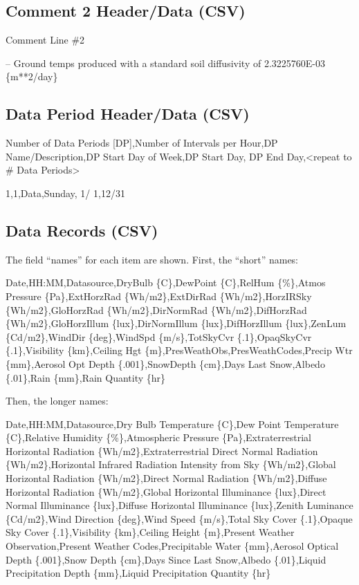 \subsection{Comment 2 Header/Data (CSV)}\label{comment-2-headerdata-csv}

Comment Line \#2

-- Ground temps produced with a standard soil diffusivity of 2.3225760E-03 \{m**2/day\}

\subsection{Data Period Header/Data (CSV)}\label{data-period-headerdata-csv}

Number of Data Periods {[}DP{]},Number of Intervals per Hour,DP Name/Description,DP Start Day of Week,DP Start Day, DP End Day,\textless{}repeat to \# Data Periods\textgreater{}

1,1,Data,Sunday, 1/ 1,12/31

\subsection{Data Records (CSV)}\label{data-records-csv}

The field ``names'' for each item are shown. First, the ``short'' names:

Date,HH:MM,Datasource,DryBulb \{C\},DewPoint \{C\},RelHum \{\%\},Atmos Pressure \{Pa\},ExtHorzRad \{Wh/m2\},ExtDirRad \{Wh/m2\},HorzIRSky \{Wh/m2\},GloHorzRad \{Wh/m2\},DirNormRad \{Wh/m2\},DifHorzRad \{Wh/m2\},GloHorzIllum \{lux\},DirNormIllum \{lux\},DifHorzIllum \{lux\},ZenLum \{Cd/m2\},WindDir \{deg\},WindSpd \{m/s\},TotSkyCvr \{.1\},OpaqSkyCvr \{.1\},Visibility \{km\},Ceiling Hgt \{m\},PresWeathObs,PresWeathCodes,Precip Wtr \{mm\},Aerosol Opt Depth \{.001\},SnowDepth \{cm\},Days Last Snow,Albedo \{.01\},Rain \{mm\},Rain Quantity \{hr\}

Then, the longer names:

Date,HH:MM,Datasource,Dry Bulb Temperature \{C\},Dew Point Temperature \{C\},Relative Humidity \{\%\},Atmospheric Pressure \{Pa\},Extraterrestrial Horizontal Radiation \{Wh/m2\},Extraterrestrial Direct Normal Radiation \{Wh/m2\},Horizontal Infrared Radiation Intensity from Sky \{Wh/m2\},Global Horizontal Radiation \{Wh/m2\},Direct Normal Radiation \{Wh/m2\},Diffuse Horizontal Radiation \{Wh/m2\},Global Horizontal Illuminance \{lux\},Direct Normal Illuminance \{lux\},Diffuse Horizontal Illuminance \{lux\},Zenith Luminance \{Cd/m2\},Wind Direction \{deg\},Wind Speed \{m/s\},Total Sky Cover \{.1\},Opaque Sky Cover \{.1\},Visibility \{km\},Ceiling Height \{m\},Present Weather Observation,Present Weather Codes,Precipitable Water \{mm\},Aerosol Optical Depth \{.001\},Snow Depth \{cm\},Days Since Last Snow,Albedo \{.01\},Liquid Precipitation Depth \{mm\},Liquid Precipitation Quantity \{hr\}

